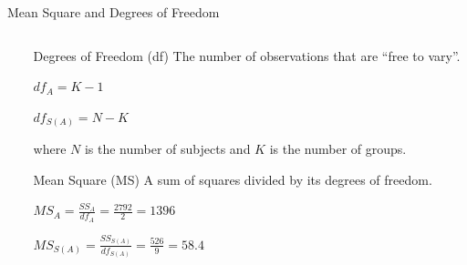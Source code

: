 \documentclass[presentation]{beamer}
\begin{document}
\begin{frame}[label={sec:org99e0600}]{Mean Square and Degrees of Freedom}
\begin{columns}
\begin{column}{.27\columnwidth}
\end{column}

\begin{column}{.73\columnwidth}
\begin{block}{Degrees of Freedom (df)}
The number of observations that are ``free to vary''.

\(df_{A} = K-1\)

\(df_{S(A)} = N-K\)

where \(N\) is the number of subjects and \(K\) is the number of groups.
\end{block}

\begin{block}{Mean Square (MS)}
A sum of squares divided by its degrees of freedom.

\(MS_A = \frac{SS_A}{df_A} = \frac{2792}{2} = 1396\)

\(MS_{S(A)} = \frac{SS_{S(A)}}{df_{S(A)}} = \frac{526}{9} = 58.4\)
\end{block}
\end{column}
\end{columns}
\end{frame}
\end{document}
